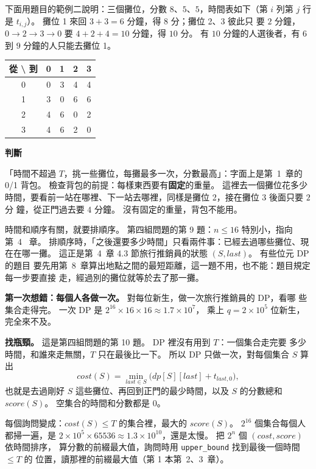 下面用題目的範例二說明：三個攤位，分數 $8$、$5$、$5$，時間表如下（第 $i$ 列第
$j$ 行是 $t_{i,j}$）。 攤位 1 來回 $3 + 3 = 6$ 分鐘，得 $8$ 分；攤位 2、3 彼此只
要 $2$ 分鐘，$0 \to 2 \to 3 \to 0$ 要 $4 + 2 + 4 = 10$ 分鐘，得 $10$ 分。 有 $10$
分鐘的人選後者，有 $6$ 到 $9$ 分鐘的人只能去攤位 1。

\begin{center}
\begin{tabular}{c|cccc}
\toprule
從 \textbackslash{} 到 & 0 & 1 & 2 & 3 \\
\midrule
0 & 0 & 3 & 4 & 4 \\
1 & 3 & 0 & 6 & 6 \\
2 & 4 & 6 & 0 & 2 \\
3 & 4 & 6 & 2 & 0 \\
\bottomrule
\end{tabular}
\end{center}

\textbf{判斷}

「時間不超過 $T$，挑一些攤位，每攤最多一次，分數最高」：字面上是第~1~章的 0/1
背包。 檢查背包的前提：每樣東西要有\textbf{固定}的重量。 這裡去一個攤位花多少
時間，要看前一站在哪裡、下一站去哪裡，同樣是攤位 2，接在攤位 3 後面只要 $2$ 分
鐘，從正門過去要 $4$ 分鐘。 沒有固定的重量，背包不能用。

時間和順序有關，就要排順序。 第四組問題的第 9 題：$n \le 16$ 特別小，指向第~4~
章。 排順序時，「之後還要多少時間」只看兩件事：已經去過哪些攤位、現在在哪一攤。
這正是第~4~章 4.3 節旅行推銷員的狀態 $(S, \mathit{last})$。 有些位元 DP 的題目
要先用第~8~章算出地點之間的最短距離，這一題不用，也不能：題目規定每一步要直接
走，經過別的攤位就等於去了那一攤。

\textbf{第一次想錯：每個人各做一次。} 對每位新生，做一次旅行推銷員的 DP，看哪
些集合走得完。 一次 DP 是 $2^{16} \times 16 \times 16 \approx 1.7 \times 10^7$，
乘上 $q = 2 \times 10^5$ 位新生，完全來不及。

\textbf{找瓶頸。} 這是第四組問題的第 10 題。 DP 裡沒有用到 $T$：一個集合走完要
多少時間，和誰來走無關，$T$ 只在最後比一下。 所以 DP 只做一次，對每個集合 $S$
算出
\[
\mathit{cost}(S) = \min_{\mathit{last} \in S}\bigl(\mathit{dp}[S][\mathit{last}]
+ t_{\mathit{last}, 0}\bigr),
\]
也就是去過剛好 $S$ 這些攤位、再回到正門的最少時間，以及 $S$ 的分數總和
$\mathit{score}(S)$。 空集合的時間和分數都是 $0$。

每個詢問變成：$\mathit{cost}(S) \le T$ 的集合裡，最大的 $\mathit{score}(S)$。
$2^{16}$ 個集合每個人都掃一遍，是 $2 \times 10^5 \times 65536 \approx 1.3 \times
10^{10}$，還是太慢。 把 $2^n$ 個 $(\mathit{cost}, \mathit{score})$ 依時間排序，
算分數的前綴最大值，詢問時用 \texttt{upper\_bound} 找到最後一個時間 $\le T$ 的
位置，讀那裡的前綴最大值（第 1 本第~2、3~章）。

